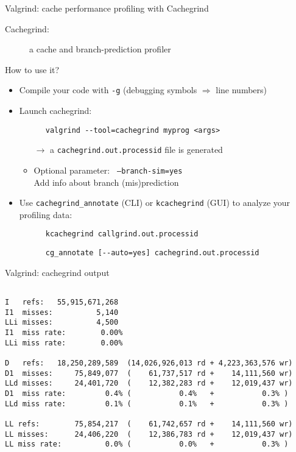 \documentclass[10pt,xcolor=table]{beamer}
\begin{document}
\begin{frame}[fragile]{Valgrind: cache performance profiling with Cachegrind}

  \begin{description}
  \item[Cachegrind:] a cache and branch-prediction profiler
  \end{description}

  How to use it?
  \begin{itemize}
  \item Compile your code with {\tt -g} (debugging symbols
    $\Rightarrow$ line numbers)
  \item Launch cachegrind:
    \begin{lstlisting}
      valgrind --tool=cachegrind myprog <args>
    \end{lstlisting}
    \begin{itemize}
    \item[$\rightarrow$] a {\tt cachegrind.out.processid} file is
      generated
    \item<2>[$\rightarrow$] Optional parameter: {\tt
        --branch-sim=yes}\\
      Add info about branch (mis)prediction
    \end{itemize}
  \item Use {\tt cachegrind\_annotate} (CLI) or {\tt kcachegrind}
    (GUI) to analyze your profiling data:
    \begin{lstlisting}
      kcachegrind callgrind.out.processid
    \end{lstlisting}

    \begin{lstlisting}
      cg_annotate [--auto=yes] cachegrind.out.processid
    \end{lstlisting}
  \end{itemize}
\end{frame}

\begin{frame}[fragile]{Valgrind: cachegrind output}

  \begin{lstlisting}[style=valgrind,caption={Cachegrind
      output: recap}]

I   refs:   55,915,671,268
I1  misses:          5,140
LLi misses:          4,500
I1  miss rate:        0.00%
LLi miss rate:        0.00%

D   refs:   18,250,289,589  (14,026,926,013 rd + 4,223,363,576 wr)
D1  misses:     75,849,077  (    61,737,517 rd +    14,111,560 wr)
LLd misses:     24,401,720  (    12,382,283 rd +    12,019,437 wr)
D1  miss rate:         0.4% (           0.4%   +           0.3% )
LLd miss rate:         0.1% (           0.1%   +           0.3% )

LL refs:        75,854,217  (    61,742,657 rd +    14,111,560 wr)
LL misses:      24,406,220  (    12,386,783 rd +    12,019,437 wr)
LL miss rate:          0.0% (           0.0%   +           0.3% )
  \end{lstlisting}

\end{frame}
\end{document}
